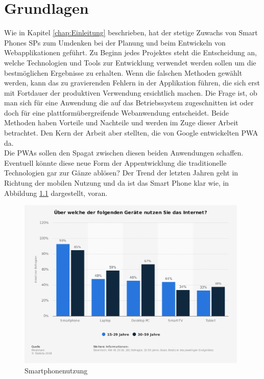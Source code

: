 \chapter{Grundlagen}
\thispagestyle{standard}
\pagestyle{standard}
\renewcommand{\footrulewidth}{0.4pt}

Wie in Kapitel \ref{chap:Einleitung} beschrieben, hat der stetige Zuwachs von Smart Phones \acs{SP}s \cite{Geraetenutzung} zum Umdenken bei der Planung und beim Entwickeln von Webapplikationen geführt.
Zu Beginn jedes Projektes steht die Entscheidung an, welche Technologien und Tools zur Entwicklung verwendet werden sollen um die bestmöglichen Ergebnisse zu erhalten.
Wenn die falschen Methoden gewählt werden, kann das zu gravierenden Fehlern in der Applikation führen, die sich erst mit Fortdauer der produktiven Verwendung ersichtlich machen. 
Die Frage ist, ob man sich für eine Anwendung die auf das Betriebssystem zugeschnitten ist oder doch für eine plattformübergreifende Webanwendung entscheidet. Beide Methoden haben Vorteile und Nachteile und werden im Zuge dieser Arbeit betrachtet. Den Kern der Arbeit aber stellten, die von Google entwickelten \acs{PWA} \cite{PWA} da. \\Die \acs{PWA}s sollen den Spagat zwischen diesen beiden Anwendungen schaffen. Eventuell könnte diese neue Form der Appentwicklung die traditionelle Technologien gar zur Gänze ablösen?
Der Trend der letzten Jahren geht in Richtung der mobilen Nutzung und da ist das Smart Phone klar wie, in Abbildung \ref{fig:Smartphonenutzung} dargestellt, voran.  


\begin{figure}[h]
	\centering
	\includegraphics[width=11cm]{BilderAllgemein/SmartPhoneNutzung}\medskip
	\caption{Smartphonenutzung \cite{Geraetenutzung}}
	\label{fig:Smartphonenutzung}
\end{figure}

